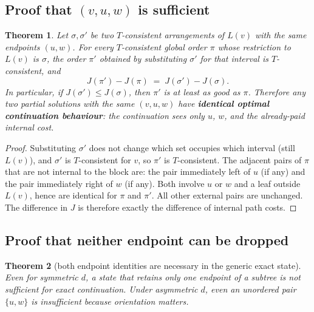 \documentclass[11pt]{article}
\theoremstyle{plain}
\newtheorem{theorem}{Theorem}[section]
\begin{document}
\subsection{Proof that \((v,u,w)\) is sufficient}

\begin{theorem}\label{thm:suff}
Let \(\sigma, \sigma'\) be two \(T\)-consistent arrangements of \(L(v)\) with
the same endpoints \((u,w)\). For every \(T\)-consistent global order \(\pi\)
whose restriction to \(L(v)\) is \(\sigma\), the order \(\pi'\) obtained by
substituting \(\sigma'\) for that interval is \(T\)-consistent, and
\[
J(\pi') - J(\pi)
\;=\;
J(\sigma') - J(\sigma).
\]
In particular, if \(J(\sigma') \le J(\sigma)\), then \(\pi'\) is at least as
good as \(\pi\). Therefore any two partial solutions with the same
\((v,u,w)\) have \textbf{identical optimal continuation behaviour}: the
continuation sees only \(u\), \(w\), and the already-paid internal cost.
\end{theorem}

\begin{proof}
Substituting \(\sigma'\) does not change which set occupies which interval
(still \(L(v)\)), and \(\sigma'\) is \(T\)-consistent for \(v\), so \(\pi'\)
is \(T\)-consistent. The adjacent pairs of \(\pi\) that are not internal to the
block are: the pair immediately left of \(u\) (if any) and the pair immediately
right of \(w\) (if any). Both involve \(u\) or \(w\) and a leaf outside
\(L(v)\), hence are identical for \(\pi\) and \(\pi'\). All other external pairs
are unchanged. The difference in \(J\) is therefore exactly the difference of
internal path costs.
\end{proof}

\subsection{Proof that neither endpoint can be dropped}

\begin{theorem}[both endpoint identities are necessary in the generic exact
state]\label{thm:twoend}
Even for symmetric \(d\), a state that retains only one endpoint of a subtree
is not sufficient for exact continuation. Under asymmetric \(d\), even an
unordered pair \(\{u,w\}\) is insufficient because orientation matters.
\end{theorem}
\end{document}
